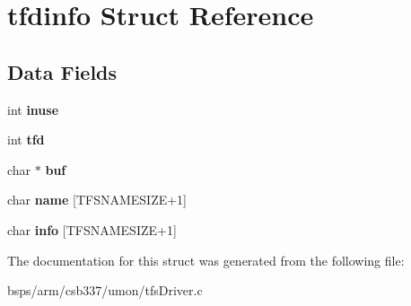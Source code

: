 \hypertarget{structtfdinfo}{}\section{tfdinfo Struct Reference}
\label{structtfdinfo}
\subsection*{Data Fields}
\begin{DoxyCompactItemize}
\item 
\mbox{\label{structtfdinfo_a70142bfec758288ac86288757822c615}} 
int {\bfseries inuse}
\item 
\mbox{\label{structtfdinfo_abb1acb45a7e2c70450b49391b5f808ae}} 
int {\bfseries tfd}
\item 
\mbox{\label{structtfdinfo_a74afa7c332b760c4f98abb0a1da4557e}} 
char $\ast$ {\bfseries buf}
\item 
\mbox{\label{structtfdinfo_a1c311d5e0819be6a781e00cbe8a83bbf}} 
char {\bfseries name} \mbox{[}T\+F\+S\+N\+A\+M\+E\+S\+I\+ZE+1\mbox{]}
\item 
\mbox{\label{structtfdinfo_a627f4444d421b7d524230c2685888f31}} 
char {\bfseries info} \mbox{[}T\+F\+S\+N\+A\+M\+E\+S\+I\+ZE+1\mbox{]}
\end{DoxyCompactItemize}


The documentation for this struct was generated from the following file\+:\begin{DoxyCompactItemize}
\item 
bsps/arm/csb337/umon/tfs\+Driver.\+c\end{DoxyCompactItemize}
